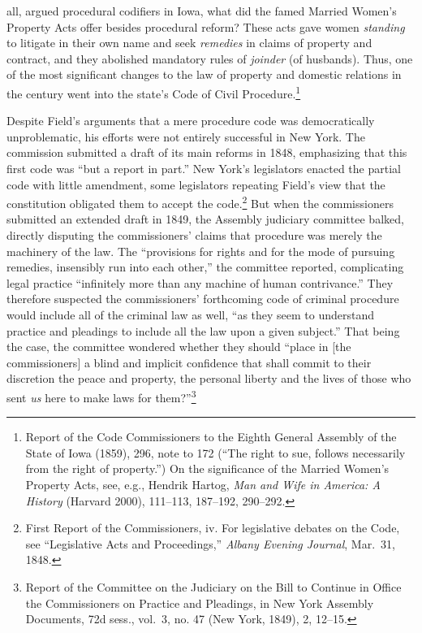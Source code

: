 \documentclass[12pt,]{article}
\let\rmarkdownfootnote\footnote%
\def\footnote{\protect\rmarkdownfootnote}
\begin{document}
all, argued procedural codifiers in Iowa, what did the famed Married
Women's Property Acts offer besides procedural reform? These acts gave
women \emph{standing} to litigate in their own name and seek
\emph{remedies} in claims of property and contract, and they abolished
mandatory rules of \emph{joinder} (of husbands). Thus, one of the most
significant changes to the law of property and domestic relations in the
century went into the state's Code of Civil Procedure.\footnote{Report
  of the Code Commissioners to the Eighth General Assembly of the State
  of Iowa (1859), 296, note to 172 (``The right to sue, follows
  necessarily from the right of property.'') On the significance of the
  Married Women's Property Acts, see, e.g., Hendrik Hartog, \emph{Man
  and Wife in America: A History} (Harvard 2000), 111--113, 187--192,
  290--292.}

Despite Field's arguments that a mere procedure code was democratically
unproblematic, his efforts were not entirely successful in New York. The
commission submitted a draft of its main reforms in 1848, emphasizing
that this first code was ``but a report in part.'' New York's
legislators enacted the partial code with little amendment, some
legislators repeating Field's view that the constitution obligated them
to accept the code.\footnote{First Report of the Commissioners, iv. For
  legislative debates on the Code, see ``Legislative Acts and
  Proceedings,'' \emph{Albany Evening Journal}, Mar.~31, 1848.} But when
the commissioners submitted an extended draft in 1849, the Assembly
judiciary committee balked, directly disputing the commissioners' claims
that procedure was merely the machinery of the law. The ``provisions for
rights and for the mode of pursuing remedies, insensibly run into each
other,'' the committee reported, complicating legal practice
``infinitely more than any machine of human contrivance.'' They
therefore suspected the commissioners' forthcoming code of criminal
procedure would include all of the criminal law as well, ``as they seem
to understand practice and pleadings to include all the law upon a given
subject.'' That being the case, the committee wondered whether they
should ``place in {[}the commissioners{]} a blind and implicit
confidence that shall commit to their discretion the peace and property,
the personal liberty and the lives of those who sent \emph{us} here to
make laws for them?''\footnote{Report of the Committee on the Judiciary
  on the Bill to Continue in Office the Commissioners on Practice and
  Pleadings, in New York Assembly Documents, 72d sess., vol.~3, no. 47
  (New York, 1849), 2, 12--15.}
\end{document}
